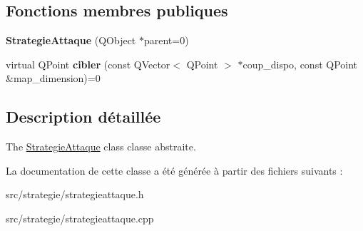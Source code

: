 \subsection*{Fonctions membres publiques}
\begin{DoxyCompactItemize}
\item 
{\bfseries Strategie\+Attaque} (Q\+Object $\ast$parent=0)\hypertarget{class_strategie_attaque_a8d01abad58c97da99157439509a773c1}{}\label{class_strategie_attaque_a8d01abad58c97da99157439509a773c1}

\item 
virtual Q\+Point {\bfseries cibler} (const Q\+Vector$<$ Q\+Point $>$ $\ast$coup\+\_\+dispo, const Q\+Point \&map\+\_\+dimension)=0\hypertarget{class_strategie_attaque_a6f1525d085ed45e326833148348b701e}{}\label{class_strategie_attaque_a6f1525d085ed45e326833148348b701e}

\end{DoxyCompactItemize}


\subsection{Description détaillée}
The \hyperlink{class_strategie_attaque}{Strategie\+Attaque} class classe abstraite. 

La documentation de cette classe a été générée à partir des fichiers suivants \+:\begin{DoxyCompactItemize}
\item 
src/strategie/strategieattaque.\+h\item 
src/strategie/strategieattaque.\+cpp\end{DoxyCompactItemize}
